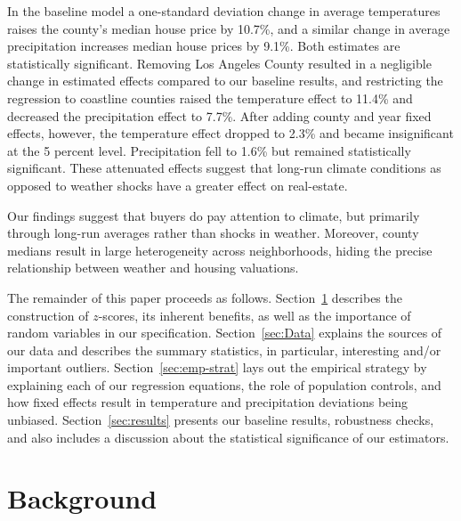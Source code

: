 \documentclass[12pt,reqno]{amsart}
\theoremstyle{definition}
\begin{document}
    In the baseline model a one-standard deviation change in average temperatures raises the county's median house price by 10.7\%, and a similar change in average precipitation increases median house prices by 9.1\%. Both estimates are statistically significant. Removing Los Angeles County resulted in a negligible change in estimated effects compared to our baseline results, and restricting the regression to coastline counties raised the temperature effect to 11.4\% and decreased the precipitation effect to 7.7\%. After adding county and year fixed effects, however, the temperature effect dropped to 2.3\% and became insignificant at the 5 percent level. Precipitation fell to 1.6\% but remained statistically significant. These attenuated effects suggest that long-run climate conditions \textemdash as opposed to weather shocks \textemdash have a greater effect on real-estate.

    Our findings suggest that buyers do pay attention to climate, but primarily through long-run averages rather than shocks in weather. Moreover, county medians result in large heterogeneity across neighborhoods, hiding the precise relationship between weather and housing valuations.

    The remainder of this paper proceeds as follows. Section~\ref{sec:background} describes the construction of $z$-scores, its inherent benefits, as well as the importance of random variables in our specification. Section~\ref{sec:Data} explains the sources of our data and describes the summary statistics, in particular, interesting and/or important outliers. Section~\ref{sec:emp-strat} lays out the empirical strategy by explaining each of our regression equations, the role of population controls, and how fixed effects result in temperature and precipitation deviations being unbiased. Section~\ref{sec:results} presents our baseline results, robustness checks, and also includes a discussion about the statistical significance of our estimators.
\section{Background}\label{sec:background}
\end{document}
